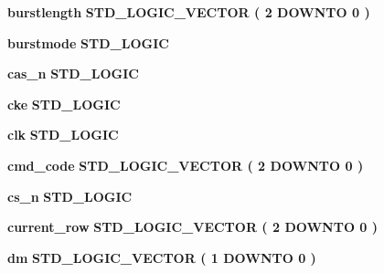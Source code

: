 \begin{DoxyCompactItemize}
\item 
{\bf burstlength} {\bfseries \textcolor{comment}{S\+T\+D\+\_\+\+L\+O\+G\+I\+C\+\_\+\+V\+E\+C\+T\+OR}\textcolor{vhdlchar}{ }\textcolor{vhdlchar}{(}\textcolor{vhdlchar}{ }\textcolor{vhdlchar}{ } \textcolor{vhdldigit}{2} \textcolor{vhdlchar}{ }\textcolor{keywordflow}{D\+O\+W\+N\+TO}\textcolor{vhdlchar}{ }\textcolor{vhdlchar}{ } \textcolor{vhdldigit}{0} \textcolor{vhdlchar}{ }\textcolor{vhdlchar}{)}\textcolor{vhdlchar}{ }} 
\item 
{\bf burstmode} {\bfseries \textcolor{comment}{S\+T\+D\+\_\+\+L\+O\+G\+IC}\textcolor{vhdlchar}{ }} 
\item 
{\bf cas\+\_\+n} {\bfseries \textcolor{comment}{S\+T\+D\+\_\+\+L\+O\+G\+IC}\textcolor{vhdlchar}{ }} 
\item 
{\bf cke} {\bfseries \textcolor{comment}{S\+T\+D\+\_\+\+L\+O\+G\+IC}\textcolor{vhdlchar}{ }} 
\item 
{\bf clk} {\bfseries \textcolor{comment}{S\+T\+D\+\_\+\+L\+O\+G\+IC}\textcolor{vhdlchar}{ }} 
\item 
{\bf cmd\+\_\+code} {\bfseries \textcolor{comment}{S\+T\+D\+\_\+\+L\+O\+G\+I\+C\+\_\+\+V\+E\+C\+T\+OR}\textcolor{vhdlchar}{ }\textcolor{vhdlchar}{(}\textcolor{vhdlchar}{ }\textcolor{vhdlchar}{ } \textcolor{vhdldigit}{2} \textcolor{vhdlchar}{ }\textcolor{keywordflow}{D\+O\+W\+N\+TO}\textcolor{vhdlchar}{ }\textcolor{vhdlchar}{ } \textcolor{vhdldigit}{0} \textcolor{vhdlchar}{ }\textcolor{vhdlchar}{)}\textcolor{vhdlchar}{ }} 
\item 
{\bf cs\+\_\+n} {\bfseries \textcolor{comment}{S\+T\+D\+\_\+\+L\+O\+G\+IC}\textcolor{vhdlchar}{ }} 
\item 
{\bf current\+\_\+row} {\bfseries \textcolor{comment}{S\+T\+D\+\_\+\+L\+O\+G\+I\+C\+\_\+\+V\+E\+C\+T\+OR}\textcolor{vhdlchar}{ }\textcolor{vhdlchar}{(}\textcolor{vhdlchar}{ }\textcolor{vhdlchar}{ } \textcolor{vhdldigit}{2} \textcolor{vhdlchar}{ }\textcolor{keywordflow}{D\+O\+W\+N\+TO}\textcolor{vhdlchar}{ }\textcolor{vhdlchar}{ } \textcolor{vhdldigit}{0} \textcolor{vhdlchar}{ }\textcolor{vhdlchar}{)}\textcolor{vhdlchar}{ }} 
\item 
{\bf dm} {\bfseries \textcolor{comment}{S\+T\+D\+\_\+\+L\+O\+G\+I\+C\+\_\+\+V\+E\+C\+T\+OR}\textcolor{vhdlchar}{ }\textcolor{vhdlchar}{(}\textcolor{vhdlchar}{ }\textcolor{vhdlchar}{ } \textcolor{vhdldigit}{1} \textcolor{vhdlchar}{ }\textcolor{keywordflow}{D\+O\+W\+N\+TO}\textcolor{vhdlchar}{ }\textcolor{vhdlchar}{ } \textcolor{vhdldigit}{0} \textcolor{vhdlchar}{ }\textcolor{vhdlchar}{)}\textcolor{vhdlchar}{ }} 

\end{DoxyCompactItemize}
